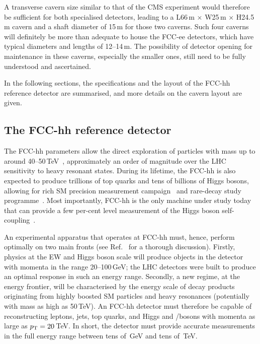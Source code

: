A transverse cavern size similar to that of the CMS experiment would therefore be sufficient for both specialised detectors, 
leading to a L66\,m $\times$ W25\,m $\times$ H24.5\,m cavern and a shaft diameter of 15\,m for those two caverns. 
Such four caverns will definitely be more than adequate to house the FCC-ee detectors, 
which have typical diameters and lengths of 12--14\,m. 
The possibility of detector opening for maintenance in these caverns, especially the smaller ones, 
still need to be fully understood and ascertained.

In the following sections, 
the specifications and the layout of the FCC-hh reference detector are summarised, 
and more details on the cavern layout are given.

\subsection{The FCC-hh reference detector}

The FCC-hh parameters allow the direct exploration of particles with mass up to 
around 40--50\,TeV~\cite{Golling:2016gvc}, 
approximately an order of magnitude over the LHC sensitivity to heavy resonant states. 
During its lifetime, the FCC-hh is also expected to produce trillions of top quarks and tens of billions of Higgs bosons, 
allowing for rich SM precision measurement campaign~\cite{Contino:2016spe,fcc-phys-cdr} 
and rare-decay study programme~\cite{dEnterria:2023wjq}. 
Most importantly, FCC-hh is the only machine under study today that can provide 
a few per-cent level measurement of the Higgs boson self-coupling~\cite{Contino:2016spe,Mangano:2020sao}. 

An experimental apparatus that operates at FCC-hh must, hence, 
perform optimally on two main fronts (see Ref.~\cite{Mangano:2022ukr} for a thorough discussion). 
Firstly, physics at the EW and Higgs boson scale will produce objects in the detector with momenta in the \pt range 20--100\,GeV; 
the LHC detectors were built to produce an optimal response in such an energy range. 
Secondly, a new regime, at the energy frontier, 
will be characterised by the energy scale of decay products originating from highly boosted SM particles 
and heavy resonances (potentially with mass as high as 50\,TeV). 
An FCC-hh detector must therefore be capable of reconstructing leptons, jets, top quarks, 
and Higgs and \PW/\PZ bosons with momenta as large as $p_\mathrm{T} = 20$\,TeV. 
In short, the detector must provide accurate measurements in the full energy range between tens of~GeV and tens of~TeV.

